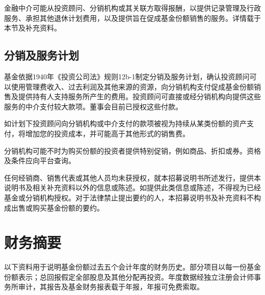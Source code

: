 \documentclass[UTF8,fontset=none,11pt,a4paper]{ctexart}
\begin{document}
金融中介可能从投资顾问、分销机构或其关联方取得报酬，以提供记录管理及行政服务、承担其他退休计划费用，以及提供旨在促成基金份额销售的服务。详情载于本节及\allowbreak\mbox{补充资料。}


\subsection*{分销及服务计划}
基金依据1940年《投资公司法》规则12b-1制定分销及服务计划，确认投资顾问可以使用管理费收入、过去利润及其他来源的资源，向分销机构支付促成基金份额销售及提供持有人支持服务所产生的费用。投资顾问可直接或经分销机构向提供这些服务的中介支付较大款项。董事会目前已授权\allowbreak\mbox{这些付款。}


如计划下投资顾问向分销机构或中介支付的款项被视为持续从某类份额的资产支付，将增加您的投资成本，并可能高于其他形式\allowbreak\mbox{的销售费。}


分销机构可能不时为购买份额的投资者提供特别促销，例如商品、折扣或券。资格及条件应向\allowbreak\mbox{平台查询。}


任何经销商、销售代表或其他人员均未获授权，就本招募说明书所述发行，提供本说明书及相关补充资料以外的信息或陈述。如提供此类信息或陈述，不得视为已经基金或分销机构授权。对于法律禁止提出要约的人，本招募说明书及补充资料不构成出售或购买基金份\allowbreak\mbox{额的要约。}


\section*{财务摘要}
以下资料用于说明基金份额过去五个会计年度的财务历史。部分项目以每一份基金份额表示；总回报假定全部股息及其他分配再投资。年度数据经独立注册会计师事务所审计，其报告及基金财务报表载于年报，年报可\allowbreak\mbox{免费索取。}
\end{document}
